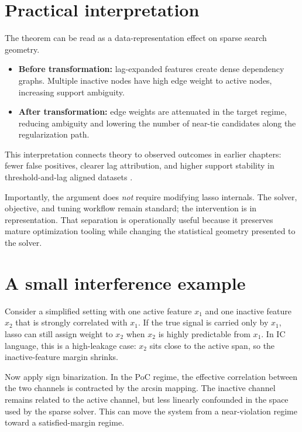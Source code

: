 \section{Practical interpretation}

The theorem can be read as a data-representation effect on sparse search geometry.

\begin{itemize}
    \item \textbf{Before transformation:} lag-expanded features create dense dependency graphs. Multiple inactive nodes have high edge weight to active nodes, increasing support ambiguity.
    \item \textbf{After transformation:} edge weights are attenuated in the target regime, reducing ambiguity and lowering the number of near-tie candidates along the regularization path.
\end{itemize}

This interpretation connects theory to observed outcomes in earlier chapters: fewer false positives, clearer lag attribution, and higher support stability in threshold-and-lag aligned datasets \autocites{orender2022,JOrender2025Efficient}.

Importantly, the argument does \emph{not} require modifying lasso internals. The solver, objective, and tuning workflow remain standard; the intervention is in representation. That separation is operationally useful because it preserves mature optimization tooling while changing the statistical geometry presented to the solver.

\section{A small interference example}

Consider a simplified setting with one active feature $x_1$ and one inactive feature $x_2$ that is strongly correlated with $x_1$. If the true signal is carried only by $x_1$, lasso can still assign weight to $x_2$ when $x_2$ is highly predictable from $x_1$. In IC language, this is a high-leakage case: $x_2$ sits close to the active span, so the inactive-feature margin shrinks.

Now apply sign binarization. In the PoC regime, the effective correlation between the two channels is contracted by the arcsin mapping. The inactive channel remains related to the active channel, but less linearly confounded in the space used by the sparse solver. This can move the system from a near-violation regime toward a satisfied-margin regime.


